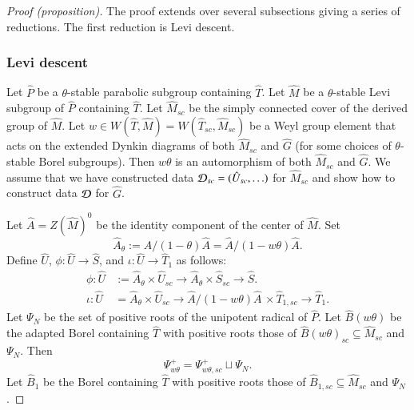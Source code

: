 \begin{proof}[Proof (proposition)]

  The  proof extends over several subsections giving a series of reductions.
  The first reduction is Levi descent.

\subsubsection{Levi descent}

Let $\hat P$ be a $\theta$-stable parabolic subgroup containing $\hat
T$.  Let $\hat M$ be a $\theta$-stable Levi subgroup of $\hat P$
containing $\hat T$.  Let $\hat M_{sc}$ be the simply connected cover
of the derived group of $\hat M$.  Let $w\in W(\hat T,\hat M) = W(\hat
T_{sc},\hat M_{sc})$ be a Weyl group element that acts on the extended
Dynkin diagrams of both $\hat M_{sc}$ and $\hat G$ (for some choices
of $\theta$-stable Borel subgroups). Then $w\theta$ is an automorphism
of both $\hat M_{sc}$ and $\hat G$.
  We assume that we have constructed data $\mathcal D_{sc} = (\hat U_{sc},\ldots)$ for $\hat M_{sc}$
  and show how to construct data $\mathcal D$ for $\hat G$.

  Let $\hat A = Z(\hat M)^0$ be the identity component of the center of $\hat M$.  Set
  \[
  \hat A_\theta :=  \hat A/(1-\theta)\hat A = \hat A / (1-w\theta)\hat A.
  \]
  Define $\hat U$, $\phi:\hat U\to \hat S$, and $\iota:\hat U\to \hat T_1$ 
  as follows:
  \begin{align*}
  \phi:\hat U &:= \hat A_\theta \times \hat U_{sc} \to \hat A_\theta \times \hat S_{sc}\to \hat S.
  \\
  \iota:\hat U &= \hat A_\theta \times \hat U_{sc} \to \hat A/(1-w\theta)\hat A\,\times
    \hat T_{1,sc} \to \hat T_1.
  \end{align*}
  Let $\Psi_N$ be the set of positive roots of the unipotent radical of $\hat P$.
  Let $\hat B(w\theta)$ be the adapted Borel containing $\hat T$ with positive roots
  those of $\hat B(w\theta)_{sc}\subseteq\hat M_{sc}$ and $\Psi_N$.
  Then 
  \[
  \Psi_{w\theta}^+ = \Psi_{w\theta,sc}^+ \sqcup \Psi_N.
  \]
  Let $\hat B_1$ be the Borel containing $\hat T$ with positive roots
  those of $\hat B_{1,sc}\subseteq\hat M_{sc}$ and $\Psi_N$.


\end{proof}
